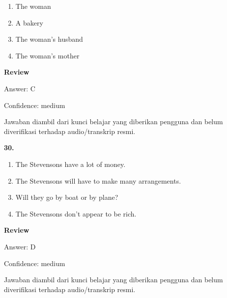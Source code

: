 \documentclass[12pt]{article}
\begin{document}
\begin{enumerate}[label=(\Alph*),leftmargin=*,itemsep=0.2em]
\item The woman
\item A bakery
\item The woman's husband
\item The woman's mother
\end{enumerate}
\par
\begingroup
\setlength{\parskip}{0pt}
\setlength{\parindent}{0pt}
\textbf{Review}\par
Answer: C\par
Confidence: medium\par
Jawaban diambil dari kunci belajar yang diberikan pengguna dan belum diverifikasi terhadap audio/transkrip resmi.\par
\endgroup
\par
\vspace{0.25\baselineskip}
\noindent\textbf{30.}
\begin{enumerate}[label=(\Alph*),leftmargin=*,itemsep=0.2em]
\item The Stevensons have a lot of money.
\item The Stevensons will have to make many arrangements.
\item Will they go by boat or by plane?
\item The Stevensons don't appear to be rich.
\end{enumerate}
\par
\begingroup
\setlength{\parskip}{0pt}
\setlength{\parindent}{0pt}
\textbf{Review}\par
Answer: D\par
Confidence: medium\par
Jawaban diambil dari kunci belajar yang diberikan pengguna dan belum diverifikasi terhadap audio/transkrip resmi.\par
\endgroup
\par
\vspace{0.25\baselineskip}
\end{document}
